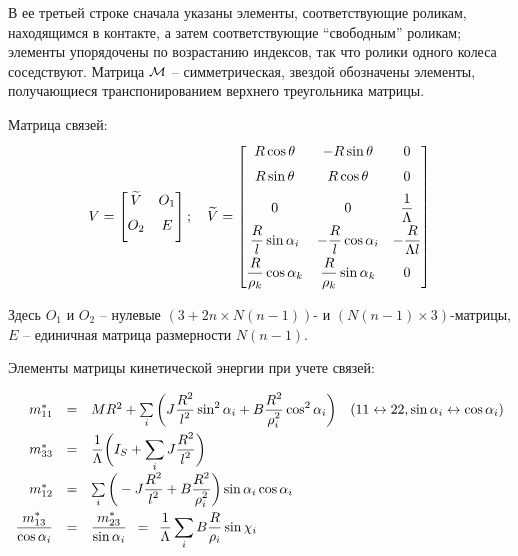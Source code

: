 В ее третьей строке сначала указаны элементы, соответствующие роликам, находящимся в контакте, а затем соответствующие ``свободным'' роликам; элементы упорядочены по возрастанию индексов, так что ролики одного колеса соседствуют. Матрица $\mathcal{M}$ -- симметрическая, звездой обозначены элементы, получающиеся транспонированием верхнего треугольника матрицы.

Матрица связей:
$$
V = \begin{bmatrix}
        \widetilde{V}  & O_1  \\[6pt]
        O_2       & E         \\[6pt]
    \end{bmatrix};
\quad
\widetilde{V} = \begin{bmatrix}
        R\cos\theta                    & -R\sin\theta                    & 0                      \\[6pt]
        R\sin\theta                    &  R\cos\theta                    & 0                      \\[6pt]
        0                              & 0                               & \displaystyle\frac{\displaystyle 1}{\displaystyle \Lambda}    \\[6pt]
        \displaystyle\frac{\displaystyle R}{\displaystyle l}\sin\alpha_i      & -\displaystyle\frac{\displaystyle R}{\displaystyle l}\cos\alpha_i      & -\displaystyle\frac{\displaystyle R}{\displaystyle \Lambda l} \\[6pt]
        \displaystyle\frac{\displaystyle R}{\displaystyle \rho_k}\cos\alpha_k &  \displaystyle\frac{\displaystyle R}{\displaystyle \rho_k}\sin\alpha_k & 0                      \\[6pt]
    \end{bmatrix}
$$

Здесь $O_1$ и $O_2$ -- нулевые $(3+2n \times N(n-1))$- и $(N(n-1) \times 3)$-матрицы, $E$ -- единичная матрица размерности $N(n-1)$.

Элементы матрицы кинетической энергии при учете связей:

\begin{equation}\label{mstar}
    \begin{array}{rcl}
        m^*_{11} & = & MR^2 + \sum\limits_i \bigg( J\ddfrac{R^2}{l^2}\sin^2\alpha_i + B\ddfrac{R^2}{\rho_i^2}\cos^2\alpha_i\bigg)\quad(11 \leftrightarrow 22, \sin\alpha_i \leftrightarrow \cos\alpha_i)\vsp
        m^*_{33} & = & \ddfrac{1}{\Lambda}\bigg(I_S + \sum\limits_i J\ddfrac{R^2}{l^2}\bigg)\vsp
        m^*_{12} & = & \sum\limits_i \bigg(-J\ddfrac{R^2}{l^2} + B\ddfrac{R^2}{\rho_i^2}\bigg)\sin\alpha_i\cos\alpha_i\vsp
        \ddfrac{m^*_{13}}{\cos\alpha_i} & = & \ddfrac{m^*_{23}}{\sin\alpha_i}\enspace=\enspace \ddfrac{1}{\Lambda}\sum\limits_i B\ddfrac{R}{\rho_i}\sin\chi_i
        \vsp
    \end{array}
\end{equation}

